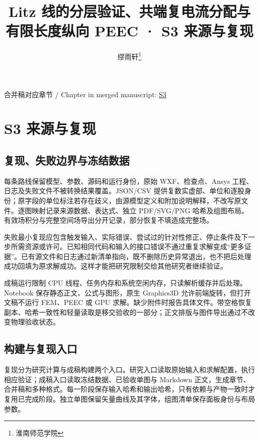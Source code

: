 \documentclass[journal,10pt]{IEEEtran}
\begin{document}
\title{Litz 线的分层验证、共端复电流分配与有限长度纵向 PEEC · S3 来源与复现}
\author{缪雨轩\thanks{淮南师范学院}}

\maketitle
\noindent 合并稿对应章节 / Chapter in merged manuscript: \href{paper_zh-CN_ieee.pdf#chapter-S3}{S3}\par
\FloatBarrier
\section*{S3 来源与复现}
\hypertarget{chapter-S3}{}
\subsection*{复现、失败边界与冻结数据}
\hypertarget{S3.report_repro.heading}{}
每条路线保留模型、参数、源码和运行身份，原始 WXF、检查点、Ansys 工程、日志及失败文件不被转换结果覆盖。JSON/CSV 提供复数实虚部、单位和逐股身份；原字段的单位标注若存在歧义，由源模型定义和附加说明解释，不改写原文件。逐图映射记录来源数据、表达式、独立 PDF/SVG/PNG 哈希及组图布局。有效场积分与完整空间场导出分开记录，部分恢复不填造成完整场。


失败最小复现应包含触发输入、实际错误、尝试过的针对性修正、停止条件及下一步所需资源或许可。已知相同代码和输入的接口错误不通过重复求解变成“更多证据”。已有源文件和日志通过新清单指向，既不删除历史异常退出，也不把后处理成功回填为原求解成功。这样才能把研究限制交给其他研究者继续验证。


成稿运行限制 CPU 线程、任务内存和系统空闲内存，只读解析缓存并后处理。Notebook 保存静态正文、公式与图形，原生 Graphics3D 允许前端旋转，但打开文稿不运行 FEM、PEEC 或 GPU 求解。缺少附件时报告具体文件。带空格恢复副本、哈希一致性和轻量读取是移交验收的一部分；正文排版与图件导出通过不改变物理验收状态。


\subsection*{构建与复现入口}
\hypertarget{S3.workflow.heading}{}
复现分为研究计算与成稿构建两个入口。研究入口读取原始输入和求解配置，执行相应验证；成稿入口读取冻结数据、已验收单图与 Markdown 正文，生成章节、合并稿和多种格式。每一阶段保存输入哈希和输出哈希，只有依赖与产物一致时才复用已完成阶段。独立单图保留矢量曲线及其字体，组图清单保存面板身份与布局参数。
\end{document}
